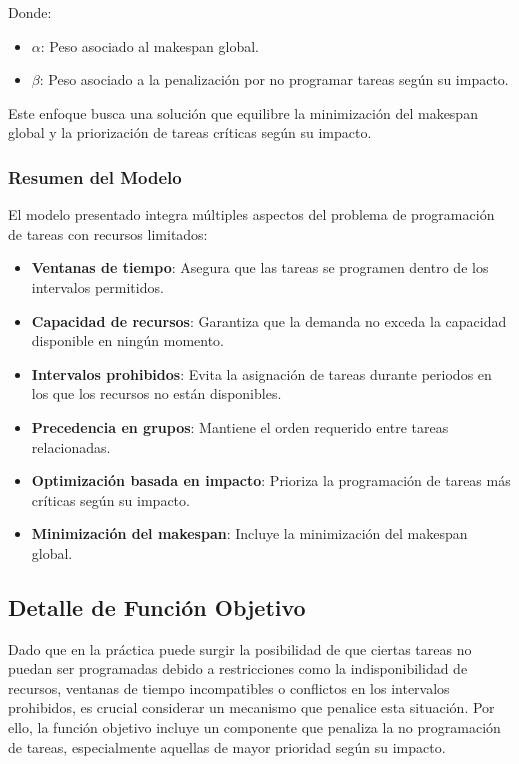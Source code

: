 \documentclass{article}
\begin{document}
Donde:

\begin{itemize}
    \item \( \alpha \): Peso asociado al makespan global.
    \item \( \beta \): Peso asociado a la penalización por no programar tareas según su impacto.
\end{itemize}

Este enfoque busca una solución que equilibre la minimización del makespan global y la priorización de tareas críticas según su impacto.

\vspace{0.5cm}

\subsubsection{Resumen del Modelo}

El modelo presentado integra múltiples aspectos del problema de programación de tareas con recursos limitados:

\begin{itemize}
    \item \textbf{Ventanas de tiempo}: Asegura que las tareas se programen dentro de los intervalos permitidos.
    \item \textbf{Capacidad de recursos}: Garantiza que la demanda no exceda la capacidad disponible en ningún momento.
    \item \textbf{Intervalos prohibidos}: Evita la asignación de tareas durante periodos en los que los recursos no están disponibles.
    \item \textbf{Precedencia en grupos}: Mantiene el orden requerido entre tareas relacionadas.
    \item \textbf{Optimización basada en impacto}: Prioriza la programación de tareas más críticas según su impacto.
    \item \textbf{Minimización del makespan}: Incluye la minimización del makespan global.
\end{itemize}



\subsection{Detalle de Función Objetivo}

Dado que en la práctica puede surgir la posibilidad de que ciertas tareas no puedan ser programadas debido a restricciones como la indisponibilidad de recursos, ventanas de tiempo incompatibles o conflictos en los intervalos prohibidos, es crucial considerar un mecanismo que penalice esta situación. Por ello, la función objetivo incluye un componente que penaliza la no programación de tareas, especialmente aquellas de mayor prioridad según su impacto.
\end{document}
